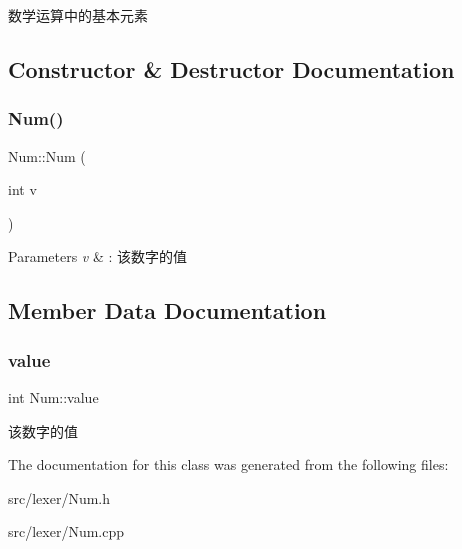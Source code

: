 数学运算中的基本元素 

\subsection{Constructor \& Destructor Documentation}
\mbox{\label{class_num_afc0c5a6bc449547b300aa036e70eda2d}} 
\subsubsection{\texorpdfstring{Num()}{Num()}}
{\footnotesize\ttfamily Num\+::\+Num (\begin{DoxyParamCaption}\item[{int}]{v }\end{DoxyParamCaption})}


\begin{DoxyParams}{Parameters}
{\em v} & \+: 该数字的值 \\
\hline
\end{DoxyParams}


\subsection{Member Data Documentation}
\mbox{\label{class_num_a40cb04ca1ed295495a2e4b358b984fb8}} 
\subsubsection{\texorpdfstring{value}{value}}
{\footnotesize\ttfamily int Num\+::value}

该数字的值 

The documentation for this class was generated from the following files\+:\begin{DoxyCompactItemize}
\item 
src/lexer/Num.\+h\item 
src/lexer/Num.\+cpp\end{DoxyCompactItemize}
